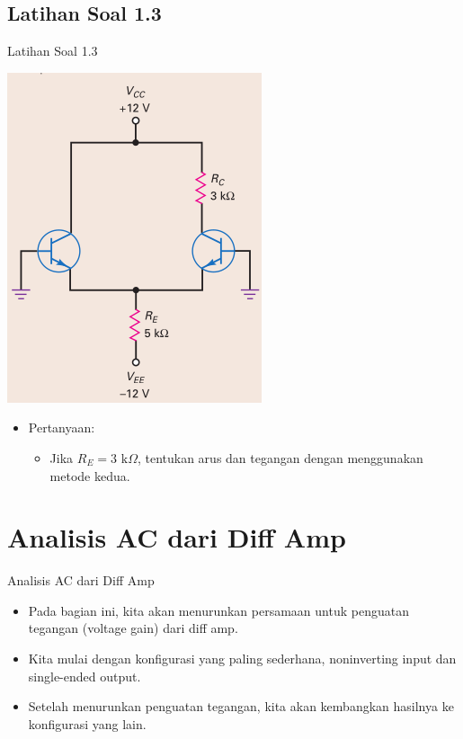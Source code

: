 \documentclass[aspectratio=169]{beamer}
\begin{document}
\subsection{Latihan Soal 1.3}
\begin{frame}{Latihan Soal 1.3}
	\begin{multicols}{2}
		\begin{center}
			\includegraphics[width=0.6\textheight]{gambar/01.latihan_soal_3}
		\end{center}
		\columnbreak
		\begin{itemize}
			\item Pertanyaan:
			\begin{itemize}
				\item Jika $ R_E = 3 \text{ k}\Omega $, tentukan arus dan tegangan dengan menggunakan metode kedua.
			\end{itemize}
		\end{itemize}
		\vfill\null
	\end{multicols}
\end{frame}

\section{Analisis AC dari Diff Amp}
\begin{frame}{Analisis AC dari Diff Amp}
	\begin{itemize}
		\item Pada bagian ini, kita akan menurunkan persamaan untuk penguatan tegangan (voltage gain) dari diff amp.
		\item Kita mulai dengan konfigurasi yang paling sederhana, noninverting input dan single-ended output.
		\item Setelah menurunkan penguatan tegangan, kita akan kembangkan hasilnya ke konfigurasi yang lain.
	\end{itemize}
\end{frame}
\end{document}
